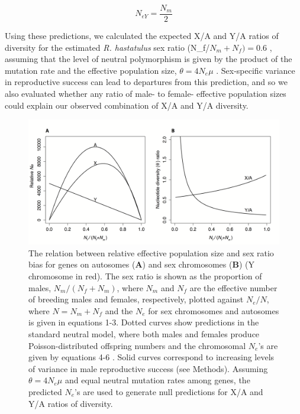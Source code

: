 \documentclass[9pt,twocolumn,twoside]{gsajnl}
\begin{document}
\begin{equation}
N_{e{Y}} = \frac{N_{m}}{2}\label{eq:NeY}
\end{equation}

 Using these predictions, we calculated the expected X/A and Y/A ratios of diversity for the estimated \textit{R. hastatulus} sex ratio (N_{f}/$N_{m}+N_{f})=0.6$ \citep{pickup2013influence}, assuming that the level of neutral polymorphism is given by the product of the mutation rate and the effective population size, $\theta=4N_{e}\mu$ \citep{watterson1975}. Sex-specific variance in reproductive success can lead to departures from this prediction, and so we also evaluated whether any ratio of male- to female- effective population sizes could explain our observed combination of X/A and Y/A diversity.



\begin{figure}[htbp]
\centering
\includegraphics[width=\linewidth]{Figure1.png}
\caption{The relation between relative effective population size and sex ratio bias for genes on autosomes (\textbf{A}) and sex chromosomes (\textbf{B}) (Y chromosome in red). The sex ratio is shown as the proportion of males, $N_{m}/(N_{f}+N_{m})$, where $N_{m}$ and $N_{f}$ are the effective number of breeding males and females, respectively, plotted against $N_{e}/N$, where $N=N_{m}+N_{f}$ and the $N_{e}$ for sex chromosomes and autosomes is given in equations 1-3. Dotted curves show predictions in the standard neutral model, where both males and females produce Poisson-distributed offspring numbers and the chromosomal $N_{e}$'s are given by equations 4-6 \citep{wright1931evolution}. Solid curves correspond to increasing levels of variance in male reproductive success \citep{nomura2002effective} (see Methods). Assuming $\theta=4N_{e}\mu$ and equal neutral mutation rates among genes, the predicted $N_{e}$'s are used to generate null predictions for X/A and Y/A ratios of diversity.
}
\label{fig:spectrum}
\end{figure}
\end{document}
